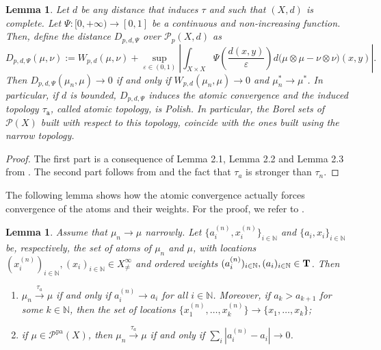 \documentclass[10pt,leqno]{amsart}
\numberwithin{equation}{section}
\newtheorem{lemma}[teorema]{Lemma}
\newcommand{\N}{\mathbb{N}}
\newcommand{\PP}{\mathcal{P}}
\newcommand{\PPpa}{\PP^{\operatorname{pa}}}
\begin{document}
\begin{lemma}
    Let $d$ be any distance that induces $\tau$ and such that $(X,d)$ is complete. Let $\Psi:[0,+\infty)\to [0,1]$ be a continuous and non-increasing function. Then, define the distance $D_{p,d,\Psi}$ over $\PP_p(X,d)$ as
    \begin{equation}\label{eq: atomic wass distance}
        D_{p,d,\Psi}(\mu,\nu) := W_{p,d}(\mu,\nu) + \sup_{\varepsilon\in(0,1)}\left| \int_{X\times X} \Psi\left( \frac{d(x,y)}{\varepsilon} \right) d\big( \mu\otimes \mu - \nu\otimes \nu\big)(x,y)\right|.   
    \end{equation}
    Then $D_{p,d,\Psi}(\mu_n,\mu) \to 0 $ if and only if $W_{p,d}(\mu_n,\mu) \to 0$ and $\mu_n^* \to \mu^*$. In particular, if $d$ is bounded, $D_{p,d,\Psi}$ induces the atomic convergence and the induced topology $\tau_{\mathtt{a}}$, called atomic topology, is Polish. In particular, the Borel sets of $\PP(X)$ built with respect to this topology, coincide with the ones built using the narrow topology.
\end{lemma}

\begin{proof}
    The first part is a consequence of Lemma 2.1, Lemma 2.2 and Lemma 2.3 from \cite{ethier1994convergence}. The second part follows from \cite{schwariz1973radon} and the fact that $\tau_a$ is stronger than $\tau_n$.
\end{proof}



The following lemma shows how the atomic convergence actually forces convergence of the atoms and their weights. For the proof, we refer to \cite[Lemma 2.5]{ethier1994convergence}.

\begin{lemma}\label{lemma: atomic topology}
    Assume that $\mu_n \to \mu$ narrowly. Let $\{a_i^{(n)}, x_i^{(n)}\}_{i\in \N}$ and $\{a_i ,x_i\}_{i\in \N}$ be, respectively, the set of atoms of $\mu_n$ and $\mu$, with locations $(x_i^{(n)})_{i\in \N},(x_i)_{i\in\N}\in X^\infty_{\neq}$ and ordered weights $(a_i^{(n)})_{i\in \N}, (a_i)_{i\in \N} \in \bold{T}$. Then 
    \begin{enumerate}
        \item $\mu_n \overset{\tau_a}{\longrightarrow} \mu$ if and only if $a_i^{(n)} \to a_i$ for all $i\in \N$.
    Moreover, if $a_k > a_{k+1}$ for some $k\in \N$, then the set of locations $\{x_1^{(n)},\dots,x_k^{(n)}\} \to \{x_1,\dots,x_k\}$;
    \item if $\mu\in \PPpa(X)$, then $\mu_n \overset{\tau_a}{\longrightarrow} \mu$ if and only if $\sum_i |a_i^{(n)} -a_i| \to 0$.
    \end{enumerate}
\end{lemma}
\end{document}
